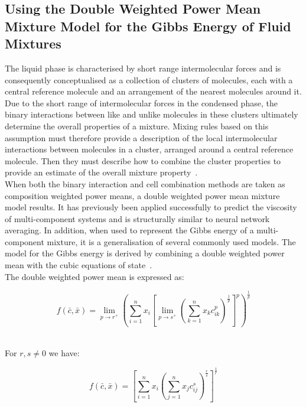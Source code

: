 \subsection{Using the Double Weighted Power Mean Mixture Model for the Gibbs Energy of Fluid Mixtures}

The liquid phase is characterised by short range intermolecular forces and is consequently conceptualised as a collection of clusters of molecules, each with a central reference molecule and an arrangement of the nearest molecules around it. Due to the short range of intermolecular forces in the condensed phase, the binary interactions between like and unlike molecules in these clusters ultimately determine the overall properties of a mixture. Mixing rules based on this assumption must therefore provide a description of the local intermolecular interactions between molecules in a cluster, arranged around a central reference molecule. Then they must describe how to combine the cluster properties to provide an estimate of the overall mixture property~\cite{Maitland, WeightedPowerMeanModel, FockeSandrock}.\\

When both the binary interaction and cell combination methods are taken as composition weighted power means, a double weighted power mean mixture model results. It has previously been applied successfully to predict the viscosity of multi-component systems and is structurally similar to neural network averaging. In addition, when used to represent the Gibbs energy of a multi-component mixture, it is a generalisation of several commonly used models. The model for the Gibbs energy is derived by combining a double weighted power mean with the cubic equations of state~\cite{WeightedPowerMeanModel, FockeSandrock, NeuralFocke}.\\
 
The double weighted power mean is expressed as:\

\begin{equation}
  f( \bar{c}, \bar{x}) = \lim_{p \rightarrow r^{+}} \left( \sum_{i = 1}^{n} x_{i} \left[ \lim_{p \rightarrow s^{+}} \left(\sum_{k=1}^{n} x_{k} c_{ik}^{p} \right)^{\frac{1}{p}} \right]^{p} \right)^\frac{1}{p}
\end{equation}\

For $r, s\neq 0$ we have:\

\begin{equation}
  f( \bar{c}, \bar{x}) = \left[\sum_{i=1}^{n} x_{i} \left(\sum_{j=1}^{n} x_{j}c_{ij}^{s}\right)^{\frac{r}{s}}\right]^{\frac{1}{r}} \label{PowerMean}
\end{equation}\


